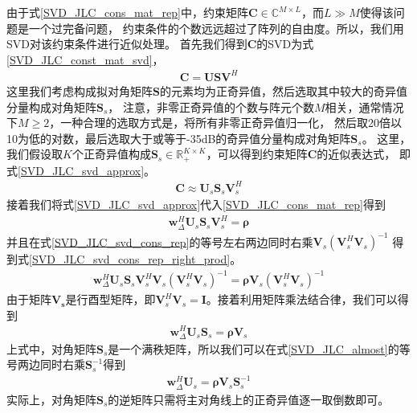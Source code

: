 \documentclass[master]{thesis-uestc}
\begin{document}
由于式\eqref{SVD_JLC_cons_mat_rep}中，约束矩阵$\bm{C}\in\mathbb{C}^{M\times L}$，而$L \gg M$使得该问题是一个过完备问题，
约束条件的个数远远超过了阵列的自由度。所以，我们用SVD对该约束条件进行近似处理。
首先我们得到$\bm{C}$的SVD为式\eqref{SVD_JLC_const_mat_svd}，
\begin{equation}\label{SVD_JLC_const_mat_svd}
    \begin{aligned}
        \bm{C} = \bm{USV}^H
    \end{aligned}
\end{equation}
这里我们考虑构成拟对角矩阵$\bm{S}$的元素均为正奇异值，然后选取其中较大的奇异值分量构成对角矩阵$\bm{S}_s$，
注意，非零正奇异值的个数与阵元个数$M$相关，通常情况下$M\ge2$，一种合理的选取方式是，将所有非零正奇异值归一化，
然后取20倍以10为低的对数，最后选取大于或等于-35dB的奇异值分量构成对角矩阵$\bm{S}_s$。
这里，我们假设取$K$个正奇异值构成$\bm{S}_s\in\mathbb{R}_+^{K \times K}$，可以得到约束矩阵$\bm{C}$的近似表达式，
即式\eqref{SVD_JLC_svd_approx}。
\begin{equation}\label{SVD_JLC_svd_approx}
    \begin{aligned}
        \bm{C} \approx \bm{U}_s\bm{S}_s\bm{V}^H_s
    \end{aligned}
\end{equation}
接着我们将式\eqref{SVD_JLC_svd_approx}代入\eqref{SVD_JLC_cons_mat_rep}得到
\begin{equation}\label{SVD_JLC_svd_cons_rep}
    \begin{aligned}
        \bm{w}^H_\Delta\bm{U}_s\bm{S}_s\bm{V}^H_s = \bm{\rho}
    \end{aligned}
\end{equation}
并且在式\eqref{SVD_JLC_svd_cons_rep}的等号左右两边同时右乘$\bm{V}_s\left(\bm{V}^H_s\bm{V}_s\right)^{-1}$
得到式\eqref{SVD_JLC_svd_cons_rep_right_prod}。
\begin{equation}\label{SVD_JLC_svd_cons_rep_right_prod}
    \begin{aligned}
        \bm{w}^H_\Delta\bm{U}_s\bm{S}_s\bm{V}^H_s\bm{V}_s\left(\bm{V}^H_s\bm{V}_s\right)^{-1} 
        = \bm{\rho}\bm{V}_s\left(\bm{V}^H_s\bm{V}_s\right)^{-1}
    \end{aligned}
\end{equation}
由于矩阵$\bm{V_s}$是行酉型矩阵，即$\bm{V}^H_s\bm{V}_s=\bm{I}$。接着利用矩阵乘法结合律，我们可以得到
\begin{equation}\label{SVD_JLC_almost}
    \begin{aligned}
        \bm{w}^H_\Delta\bm{U}_s\bm{S}_s = \bm{\rho}\bm{V}_s
    \end{aligned}
\end{equation}
上式中，对角矩阵$\bm{S}_s$是一个满秩矩阵，所以我们可以在式\eqref{SVD_JLC_almost}的等号两边同时右乘$\bm{S}^{-1}_s$得到
\begin{equation}\label{SVD_JLC_cons_fin}
    \begin{aligned}
        \bm{w}^H_\Delta\bm{U}_s = \bm{\rho}\bm{V}_s\bm{S}^{-1}_s
    \end{aligned}
\end{equation}
实际上，对角矩阵$\bm{S}_s$的逆矩阵只需将主对角线上的正奇异值逐一取倒数即可。
\end{document}
